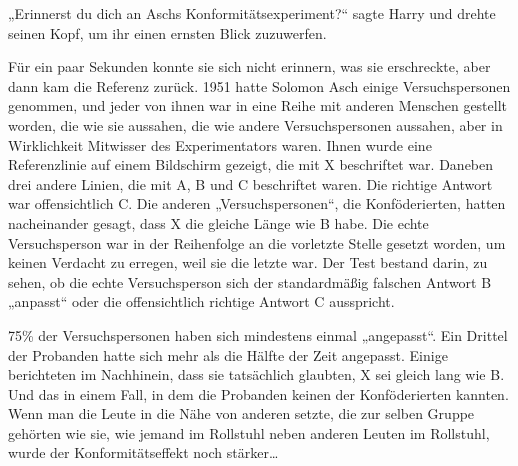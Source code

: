 „Erinnerst du dich an Aschs Konformitätsexperiment?“ sagte Harry und drehte seinen Kopf, um ihr einen ernsten Blick zuzuwerfen.

Für ein paar Sekunden konnte sie sich nicht erinnern, was sie erschreckte, aber dann kam die Referenz zurück. 1951 hatte Solomon Asch einige Versuchspersonen genommen, und jeder von ihnen war in eine Reihe mit anderen Menschen gestellt worden, die wie sie aussahen, die wie andere Versuchspersonen aussahen, aber in Wirklichkeit Mitwisser des Experimentators waren. Ihnen wurde eine Referenzlinie auf einem Bildschirm gezeigt, die mit X beschriftet war. Daneben drei andere Linien, die mit A, B und C beschriftet waren. Die richtige Antwort war offensichtlich C. Die anderen „Versuchspersonen“, die Konföderierten, hatten nacheinander gesagt, dass X die gleiche Länge wie B habe. Die echte Versuchsperson war in der Reihenfolge an die vorletzte Stelle gesetzt worden, um keinen Verdacht zu erregen, weil sie die letzte war. Der Test bestand darin, zu sehen, ob die echte Versuchsperson sich der standardmäßig falschen Antwort B „anpasst“ oder die offensichtlich richtige Antwort C ausspricht.

75\% der Versuchspersonen haben sich mindestens einmal „angepasst“. Ein Drittel der Probanden hatte sich mehr als die Hälfte der Zeit angepasst. Einige berichteten im Nachhinein, dass sie tatsächlich glaubten, X sei gleich lang wie B. Und das in einem Fall, in dem die Probanden keinen der Konföderierten kannten. Wenn man die Leute in die Nähe von anderen setzte, die zur selben Gruppe gehörten wie sie, wie jemand im Rollstuhl neben anderen Leuten im Rollstuhl, wurde der Konformitätseffekt noch stärker…

